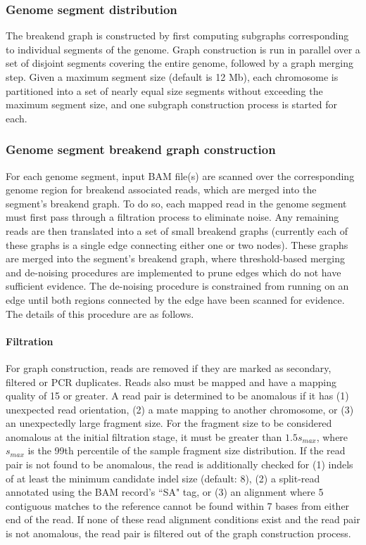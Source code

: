 \documentclass{article}
\begin{document}
\subsubsection{Genome segment distribution}

The breakend graph is constructed by first computing subgraphs corresponding to individual segments of the genome. Graph construction is run in parallel over a set of disjoint segments covering the entire genome, followed by a graph merging step. Given a maximum segment size (default is 12 Mb), each chromosome is partitioned into a set of nearly equal size segments without exceeding the maximum segment size, and one subgraph construction process is started for each.

\subsubsection{Genome segment breakend graph construction}

For each genome segment, input BAM file(s) are scanned over the corresponding genome region for breakend associated reads, which are merged into the segment's breakend graph. To do so, each mapped read in the genome segment must first pass through a filtration process to eliminate noise. Any remaining reads are then translated into a set of small breakend graphs (currently each of these graphs is a single edge connecting either one or two nodes). These graphs are merged into the segment's breakend graph, where threshold-based merging and de-noising procedures are implemented to prune edges which do not have sufficient evidence. The de-noising procedure is constrained from running on an edge until both regions connected by the edge have been scanned for evidence. The details of this procedure are as follows.

\paragraph{Filtration}
For graph construction, reads are removed if they are marked as secondary, filtered or PCR duplicates. Reads also must be mapped and have a mapping quality of 15 or greater. A read pair is determined to be anomalous if it has (1) unexpected read orientation, (2) a mate mapping to another chromosome, or (3) an unexpectedly large fragment size. For the fragment size to be considered anomalous at the initial filtration stage, it must be greater than $1.5s_{max}$, where $s_{max}$ is the 99th percentile of the sample fragment size distribution. If the read pair is not found to be anomalous, the read is additionally checked for (1) indels of at least the minimum candidate indel size (default: 8), (2) a split-read annotated using the BAM record's ``SA" tag, or (3) an alignment where 5 contiguous matches to the reference cannot be found within 7 bases from either end of the read. If none of these read alignment conditions exist and the read pair is not anomalous, the read pair is filtered out of the graph construction process.
\end{document}
